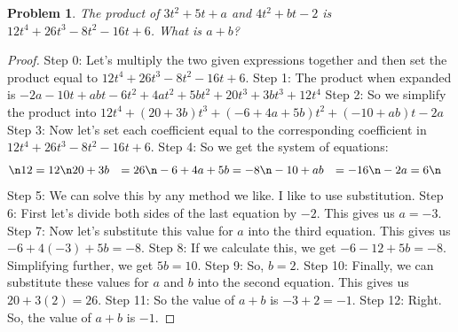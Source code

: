 \documentclass{article}
\newtheorem{theorem}{Problem}
\begin{document}
\begin{theorem}
The product of $3t^2+5t+a$ and $4t^2+bt-2$ is $12t^4+26t^3-8t^2-16t+6$. What is $a+b$?
\end{theorem}

\begin{proof}
Step 0: Let's multiply the two given expressions together and then set the product equal to $12t^4+26t^3-8t^2-16t+6$.
Step 1: The product when expanded is $-2 a - 10 t + a b t - 6 t^2 + 4 a t^2 + 5 b t^2 + 20 t^3 + 3 b t^3 + 12 t^4$
Step 2: So we simplify the product into $12 t^4 + (20  + 3 b )t^3 + (- 6 + 4 a  + 5 b )  t^2 + (- 10  + a b )t -2 a$
Step 3: Now let's set each coefficient equal to the corresponding coefficient in $12t^4+26t^3-8t^2-16t+6$.
Step 4: So we get the system of equations:\n\begin{align*}\n12 &= 12 \n20 + 3 b &= 26 \n- 6 + 4 a + 5 b &= -8 \n- 10 + a b &= -16 \n-2 a &= 6\n\end{align*}
Step 5: We can solve this by any method we like. I like to use substitution.
Step 6: First let's divide both sides of the last equation by $-2$. This gives us $a = -3$.
Step 7: Now let's substitute this value for $a$ into the third equation. This gives us $-6 + 4(-3) + 5b = -8$.
Step 8: If we calculate this, we get $-6 - 12 + 5b = -8$. Simplifying further, we get $5b = 10$.
Step 9: So, $b = 2$.
Step 10: Finally, we can substitute these values for $a$ and $b$ into the second equation. This gives us $20 + 3(2) = 26$.
Step 11: So the value of $a+b$ is $-3+2 = -1$.
Step 12: Right. So, the value of $a+b$ is $-1$.
\end{proof}
\end{document}
